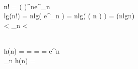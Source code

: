 \\
\because n! = \left (  \right )^{n}e^{\alpha _{n}} \\
\therefore lg(n!) = nlg\left ( \cdot {} \cdot e^{\alpha_{n}}  \right) = nlg\left ( \Theta \left ( n \right ) \right ) = \Theta (nlgn) \\
 < \alpha _{n} < 



\\
h(n) =  =  =  = e^{n} \\
\lim_{n \to \infty }h(n) = \infty 
